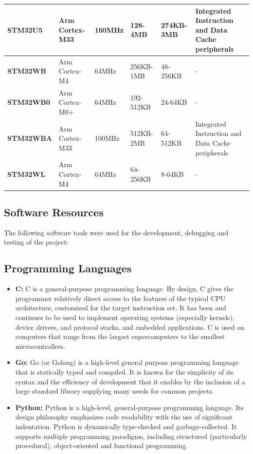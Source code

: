 \begin{xltabular}{\linewidth}{@{}>{\bfseries}l X@{} X@{} X@{} X@{} X@{}}
	\midrule
	STM32U5 &
	Arm Cortex-M33 &
	160MHz & 128-4MB & 274KB-3MB & Integrated Instruction and Data Cache peripherals \\
	\midrule
	STM32WB &
	Arm Cortex-M4 &
	64MHz & 256KB-1MB & 48-256KB & - \\
	\midrule
	STM32WB0 &
	Arm Cortex-M0+ &
	64MHz & 192-512KB & 24-64KB & - \\
	\midrule
	STM32WBA &
	Arm Cortex-M33 &
	100MHz & 512KB-2MB & 64-512KB & Integrated Instruction and Data Cache peripherals \\
	\midrule
	STM32WL &
	Arm Cortex-M4 &
	64MHz & 64-256KB & 8-64KB & - \\
	
\end{xltabular}

\subsection{Software Resources}
The following software tools were used for the  development, debugging and testing of the project:
\subsection*{Programming Languages}
\begin{itemize}
	\item \textbf{C:}
	 C is a general-purpose programming language. By design, C gives the programmer relatively direct access to the features of the typical CPU architecture, customized for the target instruction set. It has been and continues to be used to implement operating systems (especially kernels), device drivers, and protocol stacks, and embedded applications. C is used on computers that range from the largest supercomputers to the smallest microcontrollers. 
	\item \textbf{Go:}
	 Go (or Golang) is a high-level general purpose programming language that is statically typed and compiled. It is known for the simplicity of its syntax and the efficiency of development that it enables by the inclusion of a large standard library supplying many needs for common projects.
	\item \textbf{Python:}
	 Python is a high-level, general-purpose programming language. Its design philosophy emphasizes code readability with the use of significant indentation.
	 Python is dynamically type-checked and garbage-collected. It supports multiple programming paradigms, including structured (particularly procedural), object-oriented and functional programming. 
\end{itemize}
